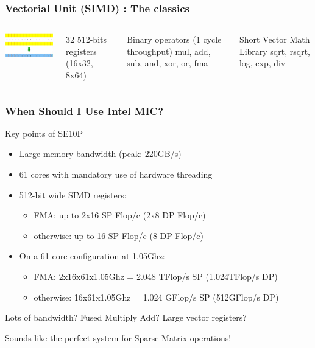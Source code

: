 \documentclass{beamer}
\newcommand{\MIC}{Intel MIC\xspace}
\begin{document}
\begin{frame}
  \frametitle{Vectorial Unit (SIMD) : The classics}

  \begin{columns}
    \column{15em}
    
    \includegraphics[width=15em]{slides-figures/vect-basic.png}%

    \column{15em}

    {\small 32 512-bits registers (16x32, 8x64)}

    \begin{block}{Binary operators (1 cycle throughput)}
      \small mul, add, sub, and, xor, or, fma
    \end{block}

    \begin{block}{Short Vector Math Library}
      sqrt, rsqrt, log, exp, div
    \end{block}

  \end{columns}
\end{frame}

\begin{frame}
  \frametitle{When Should I Use \MIC ?}

  \begin{block}{Key points of SE10P}
    \begin{itemize}
      \item Large memory bandwidth (peak: 220GB/s)
      \item 61 cores with mandatory use of hardware threading
      \item 512-bit wide SIMD registers: 
        \begin{itemize} 
          \item FMA: up to 2x16 SP Flop/c (2x8 DP Flop/c)
          \item otherwise: up to 16 SP Flop/c (8 DP Flop/c)
        \end{itemize}
      \item On a 61-core configuration at 1.05Ghz:
        \begin{itemize} 
        \item FMA: 2x16x61x1.05Ghz = 2.048 TFlop/s SP (1.024TFlop/s DP)
        \item otherwise: 16x61x1.05Ghz = 1.024 GFlop/s SP (512GFlop/s DP)
        \end{itemize}
    \end{itemize}
  \end{block}

  Lots of bandwidth? Fused Multiply Add? Large vector registers?

  Sounds like the perfect system for Sparse Matrix operations!
\end{frame}
\end{document}

